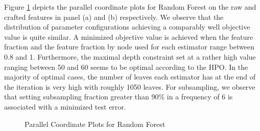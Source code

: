 Figure \ref{fig:RF_ParallelPlot} depicts the parallel coordinate plots for Random Forest on the raw and crafted features in panel (a) and (b) respectively. We observe that the distribution of parameter configurations achieving a comparably well objective value is quite similar. A minimized objective value is achieved when the feature fraction and the feature fraction by node used for each estimator range between 0.8 and 1. Furthermore, the maximal depth constraint set at a rather high value ranging between 50 and 60 seems to be optimal according to the HPO. In the majority of optimal cases, the number of leaves each estimator has at the end of the iteration is very high with roughly 1050 leaves. For subsampling, we observe that setting subsampling fraction greater than 90\% in a frequency of 6 is associated with a minimized test error.
\begin{figure}[h]
	\centering
	\caption{Parallel Coordinate Plots for Random Forest}
	\label{fig:RF_ParallelPlot}
\end{figure}

